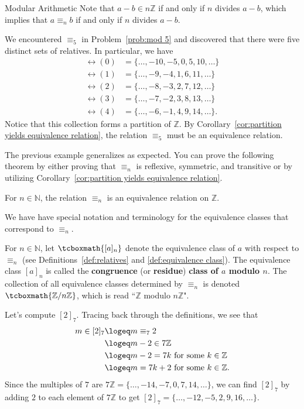 \begin{section}{Modular Arithmetic}
Note that $a-b \in n\mathbb{Z}$ if and only if $n$ divides $a-b$, which implies that $a\equiv_n b$ if and only if $n$ divides $a-b$.

\begin{example}
We encountered $\equiv_5$ in Problem~\ref{prob:mod 5} and discovered that there were five distinct sets of relatives.  In particular, we have
\begin{align*}
\rel(0) & = \{\ldots, -10, -5, 0, 5, 10,\ldots\}\\
\rel(1) & = \{\ldots, -9, -4, 1, 6, 11,\ldots\}\\
\rel(2) & = \{\ldots, -8, -3, 2, 7, 12,\ldots\}\\
\rel(3) & = \{\ldots, -7, -2, 3, 8, 13,\ldots\}\\
\rel(4) & = \{\ldots, -6, -1, 4, 9, 14,\ldots\}.
\end{align*}
Notice that this collection forms a partition of $\mathbb{Z}$.  By Corollary~\ref{cor:partition yields equivalence relation}, the relation $\equiv_5$ must be an equivalence relation.
\end{example}

The previous example generalizes as expected. You can prove the following theorem by either proving that $\equiv_n$ is reflexive, symmetric, and transitive or by utilizing Corollary~\ref{cor:partition yields equivalence relation}.

\begin{theorem}
For $n\in \mathbb{N}$, the relation $\equiv_n$ is an equivalence relation on $\mathbb{Z}$.
\end{theorem}

We have have special notation and terminology for the equivalence classes that correspond to $\equiv_n$.

\begin{definition}\label{def:congruence class}
For $n\in \mathbb{N}$, let $\tcboxmath{[a]_n}$ denote the equivalence class of $a$ with respect to $\equiv_n$ (see Definitions~\ref{def:relatives} and \ref{def:equivalence class}). The equivalence class $[a]_n$ is called the \textbf{congruence} (or \textbf{residue}) \textbf{class of $a$ modulo $n$}. The collection of all equivalence classes determined by $\equiv_n$ is denoted $\tcboxmath{\mathbb{Z}/n\mathbb{Z}}$, which is read ``$\mathbb{Z}$ modulo $n\mathbb{Z}$".
\end{definition}

\begin{example}\label{exam:twomodseven}
Let's compute $[2]_7$.  Tracing back through the definitions, we see that
\begin{align*}
m \in [2]_7 & \logeq m \equiv_7 2\\
& \logeq m-2\in 7\mathbb{Z}\\
& \logeq m-2 = 7k \text{ for some $k\in \mathbb{Z}$}\\
& \logeq m = 7k+2 \text{ for some $k\in \mathbb{Z}$}.
\end{align*}
Since the multiples of $7$ are $7\mathbb{Z} = \{\ldots,-14,-7,0,7,14,\ldots\}$, we can find $[2]_7$ by adding $2$ to each element of $7\mathbb{Z}$ to get $[2]_7 = \{\ldots,-12,-5,2,9,16,\ldots\}$.
\end{example}


\end{section}
